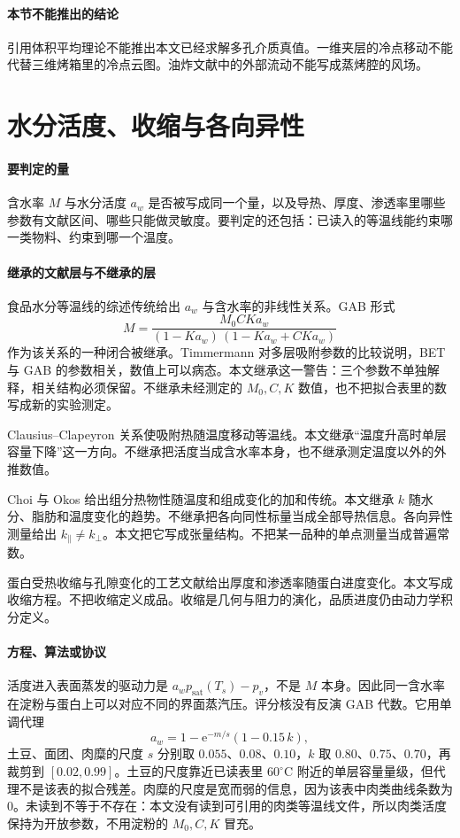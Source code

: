 \paragraph{本节不能推出的结论}
引用体积平均理论不能推出本文已经求解多孔介质真值。一维夹层的冷点移动不能代替三维烤箱里的冷点云图。油炸文献中的外部流动不能写成蒸烤腔的风场。

\section{水分活度、收缩与各向异性}

\paragraph{要判定的量}
含水率 $M$ 与水分活度 $a_w$ 是否被写成同一个量，以及导热、厚度、渗透率里哪些参数有文献区间、哪些只能做灵敏度。要判定的还包括：已读入的等温线能约束哪一类物料、约束到哪一个温度。

\paragraph{继承的文献层与不继承的层}
食品水分等温线的综述传统给出 $a_w$ 与含水率的非线性关系。GAB 形式
\[
M=\frac{M_0 C K a_w}{(1-K a_w)\,(1-K a_w+C K a_w)}
\]
作为该关系的一种闭合被继承\cite{gab1980,sorption2026}。Timmermann 对多层吸附参数的比较说明，BET 与 GAB 的参数相关，数值上可以病态\cite{gab1980}。本文继承这一警告：三个参数不单独解释，相关结构必须保留。不继承未经测定的 $M_0,C,K$ 数值，也不把拟合表里的数写成新的实验测定。

Clausius–Clapeyron 关系使吸附热随温度移动等温线。本文继承“温度升高时单层容量下降”这一方向。不继承把活度当成含水率本身，也不继承测定温度以外的外推数值。

Choi 与 Okos 给出组分热物性随温度和组成变化的加和传统\cite{choi1986}。本文继承 $k$ 随水分、脂肪和温度变化的趋势。不继承把各向同性标量当成全部导热信息。各向异性测量给出 $k_\parallel\neq k_\perp$。本文把它写成张量结构。不把某一品种的单点测量当成普遍常数。

蛋白受热收缩与孔隙变化的工艺文献给出厚度和渗透率随蛋白进度变化。本文写成收缩方程。不把收缩定义成品。收缩是几何与阻力的演化，品质进度仍由动力学积分定义。

\paragraph{方程、算法或协议}
活度进入表面蒸发的驱动力是 $a_w p_{\mathrm{sat}}(T_s)-p_v$，不是 $M$ 本身。因此同一含水率在淀粉与蛋白上可以对应不同的界面蒸汽压。评分核没有反演 GAB 代数。它用单调代理
\[
a_w=1-\mathrm{e}^{-m/s}(1-0.15\,k),
\]
土豆、面团、肉糜的尺度 $s$ 分别取 $0.055$、$0.08$、$0.10$，$k$ 取 $0.80$、$0.75$、$0.70$，再裁剪到 $[0.02,0.99]$。土豆的尺度靠近已读表里 $60^\circ\mathrm{C}$ 附近的单层容量量级，但代理不是该表的拟合残差。肉糜的尺度是宽而弱的信息，因为该表中肉类曲线条数为 $0$。未读到不等于不存在：本文没有读到可引用的肉类等温线文件，所以肉类活度保持为开放参数，不用淀粉的 $M_0,C,K$ 冒充。

